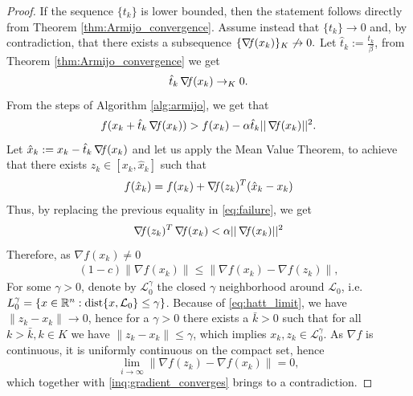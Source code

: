 \documentclass[10pt,a4paper]{article}
\begin{document}
\begin{proof}
	If the sequence $\{t_k\}$ is lower bounded, then the statement follows directly from Theorem \ref{thm:Armijo_convergence}. Assume instead that $\{t_k\}\to 0$ and, by contradiction, that there exists a subsequence $\{\operatorname*{\mathit{\nabla \!f}}(x_k)\}_K\not \to 0.$ 
	Let $\hat{t}_k:=\frac{t_k}{\beta}$, from Theorem \ref{thm:Armijo_convergence} we get 
	\begin{equation}\label{eq:hatt_limit}
		\hat{t}_k\operatorname*{\mathit{\nabla \!f}}(x_k) \to_K 0.
	\end{equation}
	From the steps of Algorithm \ref{alg:armijo}, we get that 
	\begin{equation}\label{eq:failure}
		f(x_k +\hat{t}_k \operatorname*{\mathit{\nabla \!f}}(x_k)) > f(x_k) - \alpha\hat{t}_k || \operatorname*{\mathit{\nabla \!f}}(x_k)||^2.
	\end{equation}
	Let $\hat{x}_k:=x_k -\hat{t}_k \operatorname*{\mathit{\nabla \!f}}(x_k)$ and let us apply the Mean Value Theorem, to achieve that there exists $z_k \in [x_k, \hat{x}_k]$ such that 
	\begin{equation}\label{eq:mvt_applied}
		f(\hat{x}_k) = f(x_k) + \operatorname*{\mathit{\nabla \!f}}(z_k)^T(\hat{x}_k-x_k)
	\end{equation}
	Thus, by replacing the previous equality in \eqref{eq:failure}, we get 
	\begin{equation}\label{eq:contradiction}
		\operatorname*{\mathit{\nabla \!f}}(z_k)^T \operatorname*{\mathit{\nabla \!f}}(x_k)< \alpha|| \operatorname*{\mathit{\nabla \!f}}(x_k)||^2
	\end{equation}
Therefore, as $\nabla f(x_k) \neq 0$
\begin{align}\label{inq:gradient_converges}
(1-c) \|\nabla f(x_k)\| \leq \|\nabla f(x_k) - \nabla f(z_k)\|,
\end{align}
For some $\gamma>0$, denote by $\mathcal{L}_0^\gamma$ the closed $\gamma$ neighborhood around $\mathcal{L}_0$, i.e. $L_0^\gamma = \{x\in \mathbb{R}^n : \text{dist}\{x, \mathcal{L}_0\}\leq \gamma\}$. 
Because of \eqref{eq:hatt_limit}, we have $\|z_k - x_k\|\to 0$, hence for a $\gamma>0$ there exists a $\bar{k}>0$ such that for all $k >\bar{k}, k\in K$ we have $\|z_k-x_k\|\leq \gamma$, which implies $x_k, z_k \in \mathcal{L}_0^\gamma $. 
As $\nabla f$ is continuous, it is uniformly continuous on the compact set, hence 
\begin{equation*}
\lim_{i \to \infty}        \|\nabla f(z_k) - \nabla f(x_k)\| = 0,
\end{equation*}
which together with \eqref{inq:gradient_converges} brings to a contradiction.
\end{proof}
\end{document}

